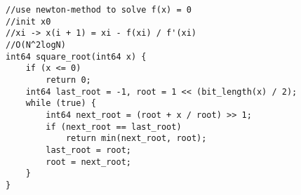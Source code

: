 \begin{lstlisting}
//use newton-method to solve f(x) = 0
//init x0
//xi -> x(i + 1) = xi - f(xi) / f'(xi)
//O(N^2logN)
int64 square_root(int64 x) {
	if (x <= 0)
		return 0;
	int64 last_root = -1, root = 1 << (bit_length(x) / 2);
	while (true) {
		int64 next_root = (root + x / root) >> 1;
		if (next_root == last_root)
			return min(next_root, root);
		last_root = root;
		root = next_root;
	}
}
\end{lstlisting}
